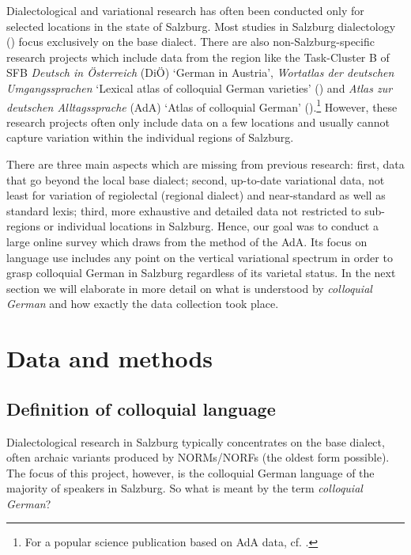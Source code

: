 \documentclass[output=paper,colorlinks, citecolor=brown]{langscibook}
\begin{document}
Dialectological and variational research has often been conducted only for selected locations in the state of Salzburg. Most studies in Salzburg dialectology (\citealt{Reiffenstein1955, Scheutz2007, Scheutz2022, Scheutzonline, Mauser2021, Mauser2022}) focus exclusively on the base dialect. There are also non-Salzburg-specific research projects which include data from the region like the Task-Cluster B of SFB \textit{Deutsch in Österreich} (DiÖ) ‘German in Austria’, \textit{Wortatlas der deutschen Umgangssprachen} ‘Lexical atlas of colloquial German varieties’ (\citealt{Eichhoff1977, Eichhoff1978, Eichhoff1993, Eichhoff2000}) and \textit{Atlas zur deutschen Alltagssprache} (AdA) ‘Atlas of colloquial German’ (\citealt{ElspaßMöller2003ff}).\footnote{For a popular science publication based on AdA data, cf. \citet{LeemannEtAl2018}.} However, these research projects often only include data on a few locations and usually cannot capture variation within the individual regions of Salzburg.

There are three main aspects which are missing from previous research: first, data that go beyond the local base dialect; second, up-to-date variational data, not least for variation of regiolectal (regional dialect) and near-standard as well as standard lexis; third, more exhaustive and detailed data not restricted to sub-regions or individual locations in Salzburg. Hence, our goal was to conduct a large online survey which draws from the method of the AdA. Its focus on language use includes any point on the vertical variational spectrum in order to grasp colloquial German in Salzburg regardless of its varietal status. In the next section we will elaborate in more detail on what is understood by \textit{colloquial German} and how exactly the data collection took place.

\section{Data and methods} \label{sec:blaßnigg:2}
\subsection{Definition of colloquial language} \label{sec:blaßnigg:2.1}

Dialectological research in Salzburg typically concentrates on the base dialect, often archaic variants produced by NORMs/NORFs (the oldest form possible). The focus of this project, however, is the colloquial German language of the majority of speakers in Salzburg. So what is meant by the term \textit{colloquial German}? 
\end{document}
